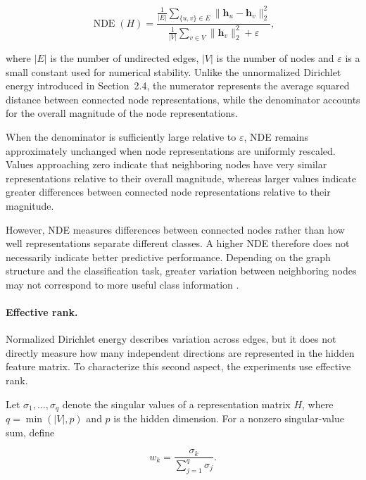 \documentclass[english]{lni}
\begin{document}
\begin{equation}
\operatorname{NDE}(H)
=
\frac{
\frac{1}{|E|}
\sum_{\{u,v\}\in E}
\|\mathbf{h}_u-\mathbf{h}_v\|_2^2
}{
\frac{1}{|V|}
\sum_{v\in V}\|\mathbf{h}_v\|_2^2
+\varepsilon
},
\label{eq:nde}
\end{equation}

where $|E|$ is the number of undirected edges, $|V|$ is the number of nodes and $\varepsilon$ is a small
constant used for numerical stability. Unlike the unnormalized Dirichlet energy introduced in Section~2.4, the numerator represents the average squared distance between connected node representations, while the denominator accounts for the overall magnitude of the node representations.

When the denominator is sufficiently large relative to $\varepsilon$, NDE remains approximately unchanged when node representations are uniformly rescaled. Values approaching zero indicate that neighboring nodes have very similar representations relative to their overall magnitude, whereas larger values indicate greater differences between connected node representations relative to their magnitude.

However, NDE measures differences between connected nodes rather than how well representations separate
different classes. A higher NDE therefore does not necessarily indicate better predictive performance. Depending on the graph structure and the classification task, greater variation between neighboring nodes may not correspond to more useful class information
\cite{rusch2023oversmoothing,arnaiz2026demystifying}.

\paragraph{Effective rank.}

Normalized Dirichlet energy describes variation across edges, but it does not directly measure how many independent directions are represented in the hidden feature matrix. To characterize this second aspect, the experiments use effective rank.

Let $\sigma_1,\ldots,\sigma_q$ denote the singular values of a representation matrix $H$, where $q=\min(|V|,p)$ and $p$ is the hidden dimension. For a nonzero singular-value sum, define

\begin{equation}
w_k=\frac{\sigma_k}{\sum_{j=1}^{q}\sigma_j}.
\label{eq:singular-weight}
\end{equation}
\end{document}
